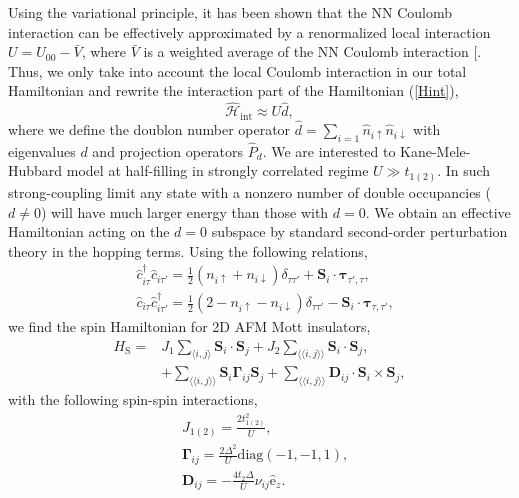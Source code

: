 \documentclass[aps,prl,twocolumn,amsmath,amssymb,nobibnotes]{revtex4-1}%
\renewcommand{\cite}[1]{{[}\onlinecite{#1}{]}}
\newcommand{\n}{\nonumber}
\newcommand{\bs}{\boldsymbol}
\begin{document}
Using the variational principle, it has been shown that the NN Coulomb interaction can be effectively approximated by a renormalized local interaction $U =U_{00} - \bar{V}$, where $\bar{V}$ is a weighted average of the NN Coulomb interaction \cite{Schuler2013,Stepanov2017}. Thus, we only take into account the local Coulomb interaction in our total Hamiltonian and rewrite the interaction part of the Hamiltonian (\ref{Hint}),
\begin{equation}
\hat{\mathcal{H}}_{\text{int}} \approx U\hat{d},
\end{equation}
where we define the doublon number operator $\hat{d} = \sum_{i=1} \hat{n}_{i\uparrow}\hat{n}_{i\downarrow}$ with eigenvalues $d$ and projection operators $\hat{P}_d$. We are interested to Kane-Mele-Hubbard model at half-filling in strongly correlated regime $U\gg t_{1(2)}$. In such strong-coupling limit any state with a nonzero number of double occupancies ($d \neq 0$) will have much larger energy than those with $d=0$. We obtain an effective Hamiltonian acting on the $d=0$ subspace by standard second-order perturbation theory in the hopping terms. Using the following relations,
\begin{align}
&\hat{c}_{i \tau}^\dagger \hat{c}_{i \tau'} = \frac{1}{2} (n_{i \uparrow} + n_{i \downarrow})\delta_{\tau \tau'}  + \bs{S}_i\cdot\bs{\tau}_{\tau', \tau}, \label{SpinOperatorInv1}\\
&\hat{c}_{i \tau} \hat{c}_{i \tau'}^\dagger = \frac{1}{2} (2 - n_{i \uparrow} - n_{i \downarrow}) \delta_{\tau \tau'} - \bs{S}_i\cdot\bs{\tau}_{\tau, \tau'}, \label{SpinOperatorInv2}
\end{align}
we find the spin Hamiltonian for 2D AFM Mott insulators,
\begin{align}
\label{MKMHeff0}
H_{\text{S}} =& J_{1}\sum_{\langle i,j \rangle} \bs{S}_i\cdot\bs{S}_j + J_{2}\sum_{\langle \langle i,j \rangle \rangle} \bs{S}_i\cdot\bs{S}_j,  \n \\
&+ \sum_{\langle \langle i,j \rangle \rangle} \bs{S}_i \bs{\Gamma}_{ij} \bs{S}_j +\sum_{\langle \langle i,j \rangle \rangle} \bs{D}_{ij}\cdot \bs{S}_i \times \bs{S}_j,
\end{align}
with the following spin-spin interactions,
\begin{subequations}
\label{spin-para}
\begin{align}
&J_{1(2)} = \frac{2t_{1(2)}^2}{U}, \\
&\bs{\Gamma}_{ij} =\frac{2\Delta^2}{U} \text{diag}(-1,-1,1),\\
&\bs{D}_{ij} = - \frac{4 t_2 \Delta}{U}\nu_{ij}  \hat{\mathrm{e}}_z.
\end{align}
\end{subequations}
\end{document}
